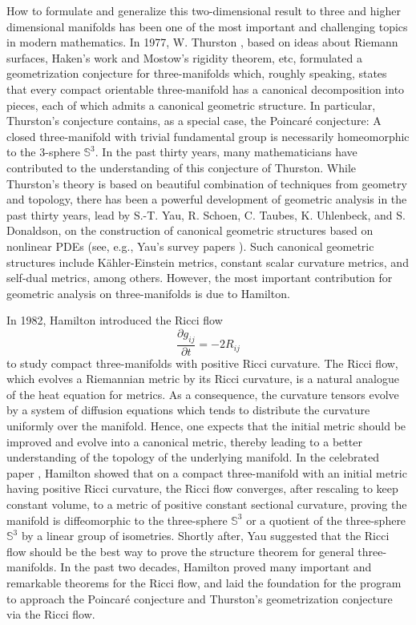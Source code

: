 How to formulate and generalize this two-dimensional result to
three and higher dimensional manifolds has been one of the most
important and challenging topics in modern mathematics. In 1977,
W. Thurston \cite{Th82}, based on ideas about Riemann surfaces,
Haken's work and Mostow's rigidity theorem, etc, formulated a
geometrization conjecture for three-manifolds which, roughly
speaking, states that every compact orientable three-manifold has
a canonical decomposition into pieces, each of which admits a
canonical geometric structure. In particular, Thurston's
conjecture contains, as a special case, the Poincar\'e conjecture:
A closed three-manifold with trivial fundamental group is
necessarily homeomorphic to the 3-sphere $\mathbb{S}^3$. In the
past thirty years, many mathematicians have contributed to the
understanding of this conjecture of Thurston. While Thurston's
theory is based on beautiful combination of techniques from
geometry and topology, there has been a powerful development of
geometric analysis in the past thirty years, lead by S.-T. Yau, R.
Schoen, C. Taubes, K. Uhlenbeck, and S. Donaldson, on the
construction of canonical geometric structures based on nonlinear
PDEs (see, e.g., Yau's survey papers \cite{Y78, Y06}). Such
canonical geometric structures include K\"ahler-Einstein metrics,
constant scalar curvature metrics, and self-dual metrics, among
others. However, the most important contribution for geometric
analysis on three-manifolds is due to Hamilton.

In 1982, Hamilton \cite{Ha82} introduced the Ricci flow
$$\frac{\partial g_{ij}}{\partial t}=-2R_{ij}$$
to study compact three-manifolds with positive Ricci curvature.
The Ricci flow, which evolves a Riemannian metric by its Ricci
curvature, is a natural analogue of the heat equation for metrics.
As a consequence, the curvature tensors evolve by a system of
diffusion equations which tends to distribute the curvature
uniformly over the manifold. Hence, one expects that the initial
metric should be improved and evolve into a canonical metric,
thereby leading to a better understanding of the topology of the
underlying manifold. In the celebrated paper \cite{Ha82}, Hamilton
showed that on a compact three-manifold with an initial metric
having positive Ricci curvature, the Ricci flow converges, after
rescaling to keep constant volume, to a metric of positive
constant sectional curvature, proving the manifold is
diffeomorphic to the three-sphere $\mathbb{S}^3$ or a quotient of
the three-sphere $\mathbb{S}^3$ by a linear group of isometries.
Shortly after, Yau suggested that the Ricci flow should be the
best way to prove the structure theorem for general
three-manifolds. In the past two decades, Hamilton proved many
important and remarkable theorems for the Ricci flow, and laid the
foundation for the program to approach the Poincar\'e conjecture
and Thurston's geometrization conjecture via the Ricci flow.

